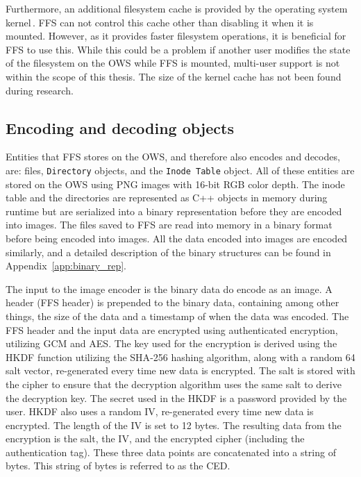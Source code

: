 Furthermore, an additional filesystem cache is provided by the operating system kernel\,\cite{MountOptionsOsxfuse, gowdappaExperiencesFUSEReal2019}. \gls{FFS} can not control this cache other than disabling it when it is mounted. However, as it provides faster filesystem operations, it is beneficial for \gls{FFS} to use this. While this could be a problem if another user modifies the state of the filesystem on the \gls{OWS} while \gls{FFS} is mounted, \mbox{multi-user} support is not within the scope of this thesis. The size of the kernel cache has not been found during research.

\subsection{Encoding and decoding objects}
\label{subsec:file_enc_dec}
Entities that \gls{FFS} stores on the \gls{OWS}, and therefore also encodes and decodes, are: files, \texttt{Directory} objects, and the \texttt{Inode Table} object. All of these entities are stored on the \gls{OWS} using PNG images with \mbox{16-bit} \gls{RGB} color depth. The inode table and the directories are represented as C++ objects in memory during runtime but are serialized into a binary representation before they are encoded into images. The files saved to \gls{FFS} are read into memory in a binary format before being encoded into images. All the data encoded into images are encoded similarly, and a detailed description of the binary structures can be found in Appendix~\ref{app:binary_rep}. 

The input to the image encoder is the binary data do encode as an image. A header (\gls{FFS} header) is prepended to the binary data, containing among other things, the size of the data and a timestamp of when the data was encoded. The \gls{FFS} header and the input data are encrypted using authenticated encryption, utilizing \gls{GCM} and \gls{AES}. The key used for the encryption is derived using the \gls{HKDF} function utilizing the \gls{SHA}-256 hashing algorithm, along with a random \SI{64}{\byte} salt vector, \mbox{re-generated} every time new data is encrypted. The salt is stored with the cipher to ensure that the decryption algorithm uses the same salt to derive the decryption key. The secret used in the \gls{HKDF} is a password provided by the user. \gls{HKDF} also uses a random \gls{IV}, \mbox{re-generated} every time new data is encrypted. The length of the \gls{IV} is set to 12 bytes. The resulting data from the encryption is the salt, the \gls{IV}, and the encrypted cipher (including the authentication tag). These three data points are concatenated into a string of bytes. This string of bytes is referred to as the \gls{CED}.

